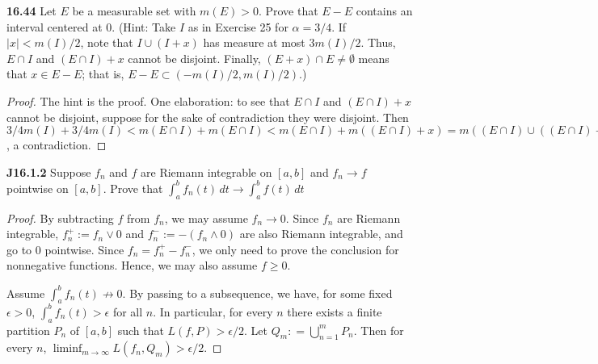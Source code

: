 \documentclass{article}
\newcommand{\p}{\textbf}
\begin{document}
\p{16.44} Let $E$ be a measurable set with $m(E) > 0$. Prove that $E-E$ contains an interval centered at 0. (Hint: Take $I$ as in Exercise 25 for $\alpha = 3/4$. If $|x| < m(I)/2$, note that $I \cup (I + x)$ has measure at most $3m(I)/2$. Thus, $E \cap I $ and $(E \cap I) + x$ cannot be disjoint. Finally, $(E+x) \cap E \neq \emptyset$ means that $x \in E - E$; that is, $E - E \subset (-m(I)/2, m(I)/2)$.)
\begin{proof}
The hint is the proof.  One elaboration: to see that $E \cap I$ and $(E \cap I) +x$ cannot be disjoint, suppose for the sake of contradiction they were disjoint.  Then $3/4 m(I) + 3/4 m(I) < m(E \cap I) + m(E \cap I) < m(E \cap I) + m((E \cap I) + x) = m((E \cap I) \cup ((E \cap I) + x)) = m (E \cap (I \cup (I+x))) \leq m(I \cup I +x) \leq 3/2 m(I)$, a contradiction.
\end{proof}

\begin{comment}
\p{J16.1.1} Suppose $f_n \in C[0,1], 0 \leq f_n \leq 1$, and $f_n \rightarrow 0$ pointwise on $[0,1]$. Prove that $\int_0^1 f_n(t)\,dt \rightarrow 0$ as $n \rightarrow \infty$.
\begin{proof}
\end{proof}
\end{comment}

\p{J16.1.2} Suppose $f_n$ and $f$ are Riemann integrable on $[a,b]$ and $f_n \rightarrow f$ pointwise on $[a,b]$. Prove that $\int_a^b f_n(t) \, dt \rightarrow \int_a^b f(t)\, dt$
\begin{proof}
By subtracting $f$ from $f_n$, we may assume $f_n \rightarrow 0$.  Since $f_n$ are Riemann integrable, $f_n^+ := f_n \vee 0$  and $f_n^- := -(f_n \wedge 0)$ are also Riemann integrable, and go to 0 pointwise.  Since $f_n = f_n^+ - f_n^-$, we only need to prove the conclusion for nonnegative functions. Hence, we may also assume $f \geq 0$.

Assume $\int_a^b f_n(t) \not\rightarrow 0$.  By passing to a subsequence, we have, for some fixed $\epsilon > 0$, $\int_a^b f_n(t) > \epsilon$  for all $n$.  In particular, for every $n$ there exists a finite partition $P_n$ of $[a,b]$ such that $L(f,P) > \epsilon / 2$. Let $Q_m: = \bigcup_{n=1}^m P_n$. Then for every $n$, $\liminf_{m\rightarrow\infty} L(f_n, Q_m) > \epsilon/2$.

\end{proof}
\end{document}
